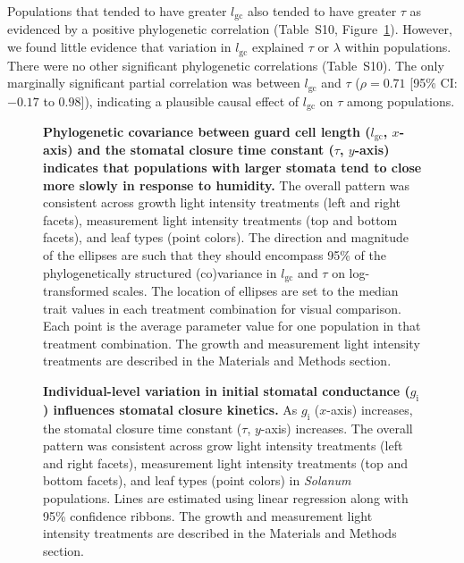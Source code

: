 \documentclass[
  letterpaper,
  DIV=11,
  numbers=noendperiod]{scrartcl}
\newcommand{\gcl}{$l_\mathrm{gc}$}
\newcommand{\gi}{$g_\mathrm{i}$}
\begin{document}
Populations that tended to have greater \gcl{} also tended to have
greater \(\tau\) as evidenced by a positive phylogenetic correlation
(Table~S10, Figure~\ref{fig-gcl-tau}). However, we found
little evidence that variation in \gcl{} explained \(\tau\) or
\(\lambda\) within populations. There were no other significant
phylogenetic correlations (Table~S10). The only marginally
significant partial correlation was between \gcl{} and \(\tau\)
(\(\rho = 0.71\) {[}95\% CI: \(-0.17\) to \(0.98\){]}), indicating a
plausible causal effect of \gcl{} on \(\tau\) among populations.

\begin{figure}


\caption{\label{fig-gcl-tau}\textbf{Phylogenetic covariance between guard cell length (\gcl, $x$-axis) and the stomatal closure time constant ($\tau$, $y$-axis) indicates that  populations with larger stomata tend to close more slowly in response to humidity.}
The overall pattern was consistent across growth light intensity
treatments (left and right facets), measurement light intensity
treatments (top and bottom facets), and leaf types (point colors). The
direction and magnitude of the ellipses are such that they should
encompass 95\% of the phylogenetically structured (co)variance in \gcl{}
and \(\tau\) on log-transformed scales. The location of ellipses are set
to the median trait values in each treatment combination for visual
comparison. Each point is the average parameter value for one population
in that treatment combination. The growth and measurement light
intensity treatments are described in the Materials and Methods
section.}

\end{figure}%

\begin{figure}


\caption{\label{fig-gi-tau}\textbf{Individual-level variation in initial stomatal conductance (\gi) influences stomatal closure kinetics.}
As \gi{} (\(x\)-axis) increases, the stomatal closure time constant
(\(\tau\), \(y\)-axis) increases. The overall pattern was consistent
across grow light intensity treatments (left and right facets),
measurement light intensity treatments (top and bottom facets), and leaf
types (point colors) in \textit{Solanum} populations. Lines are
estimated using linear regression along with 95\% confidence ribbons.
The growth and measurement light intensity treatments are described in
the Materials and Methods section.}

\end{figure}%
\end{document}
